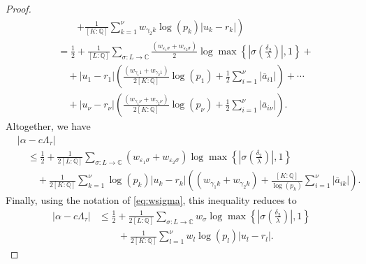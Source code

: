 \begin{proof}
\begin{align*}
	&\quad\quad \left.+ \frac{1}{[K:\mathbb{Q}]}\sum_{k = 1}^{\nu} w_{\gamma_2 k}\log(p_k)|u_k - r_k| \right) \\
	& = \frac{1}{2} + \frac{1}{[L:\mathbb{Q}]}\sum_{\sigma :L \to \mathbb{C}} \frac{(w_{\varepsilon_1 \sigma} + w_{\varepsilon_2 \sigma})}{2}\log \max \left\{ \left|\sigma\left(\frac{\delta_2}{\lambda}\right)\right|, 1\right\} + \\
	& \quad + |u_1 - r_1|\left( \frac{(w_{\gamma_1 1} + w_{\gamma_2 1})}{2[K:\mathbb{Q}]}\log(p_1) + \frac{1}{2}\sum_{i=1}^{\nu}|\overline{a}_{i1}|\right) + \cdots \\
	& \quad + |u_{\nu} - r_{\nu}|\left( \frac{(w_{\gamma_1 {\nu}} + w_{\gamma_2 {\nu}})}{2[K:\mathbb{Q}]}\log(p_{\nu}) + \frac{1}{2}\sum_{i=1}^{\nu}|\overline{a}_{i{\nu}}|\right). 
\end{align*}
Altogether, we have
\begin{align*}
& |\alpha-c\Lambda_\tau| \\
	& \quad \leq \frac{1}{2} + \frac{1}{2[L:\mathbb{Q}]}\sum_{\sigma :L \to \mathbb{C}} (w_{\varepsilon_1 \sigma} + w_{\varepsilon_2 \sigma})\log \max \left\{ \left|\sigma\left(\frac{\delta_2}{\lambda}\right)\right|, 1\right\} \\
	& \quad \quad+ \frac{1}{2[K:\mathbb{Q}]}\sum_{k = 1}^{\nu} \log(p_k)|u_k - r_k|\left( (w_{\gamma_1 k} + w_{\gamma_2 k}) + \frac{[K:\mathbb{Q}]}{\log(p_k)}\sum_{i=1}^{\nu}|\overline{a}_{ik}|\right).
\end{align*}
Finally, using the notation of \eqref{eq:wsigma}, this inequality reduces to
\begin{align*}
|\alpha-c\Lambda_\tau|
	& \leq \frac{1}{2} + \frac{1}{2[L:\mathbb{Q}]}\sum_{\sigma :L \to \mathbb{C}} w_{\sigma}\log \max \left\{ \left|\sigma\left(\frac{\delta_2}{\lambda}\right)\right|, 1\right\} \\
	&\quad\quad + \frac{1}{2[K:\mathbb{Q}]}\sum_{l = 1}^{\nu}w_l \log(p_l)|u_l - r_l|.
\end{align*}


\end{proof}
